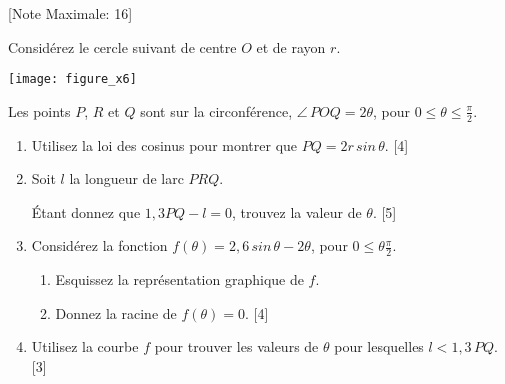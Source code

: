\begin{question}
  \hspace*{\fill} [Note Maximale: 16]\par
  \medskip
  \noindent Considérez le cercle suivant de centre $O$ et de rayon $r$.\par
  \medskip
  \begin{center} %
    \texttt{[image: figure\_x6]}\par
    \noindent Les points $P$, $R$ et $Q$ sont sur la circonférence, $\angle\,POQ = 2\theta$, pour $0 \le \theta \le \frac{\pi}{2}$.\par
  \end{center} %

  \begin{enumerate}[label=(\alph*)]
    \item Utilisez la loi des cosinus pour montrer que $PQ = 2r\,sin\,\theta$.\hspace*{\fill} [4]
    \item Soit $l$ la longueur de larc $PRQ$.\par
      Étant donnez que $1,3PQ - l = 0$, trouvez la valeur de $\theta$.\hspace*{\fill} [5]
    \item Considérez la fonction $f(\theta) = 2,6\,sin\,\theta - 2\theta$, pour $0 \le \theta \frac{\pi}{2}$.
      \begin{enumerate}[label=(\roman*)]
        \item Esquissez la représentation graphique de $f$.
        \item Donnez la racine de $f(\theta) = 0$.\hspace*{\fill} [4]
      \end{enumerate}
    \item Utilisez la courbe $f$ pour trouver les valeurs de $\theta$ pour lesquelles $l < 1,3\,PQ$.\hspace*{\fill} [3]
  \end{enumerate}
\end{question}
